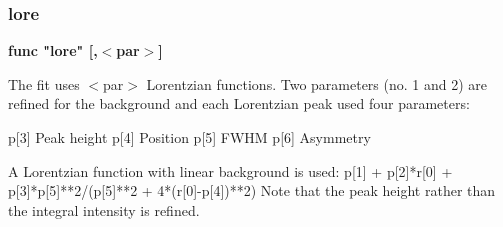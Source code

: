 \subsubsection{lore}
{\bf func "lore" [,$ <$par$> $] \par }
\par
\vspace{3pt}
The fit uses $ <$par$> $ Lorentzian functions. Two parameters (no. 1 and 2) 
are refined for the background and each Lorentzian peak used four 
parameters: 
\par
\begin{MacVerbatim}
p[3] Peak height
p[4] Position
p[5] FWHM
p[6] Asymmetry
\end{MacVerbatim}
A Lorentzian function with linear background is used: 
p[1] + p[2]*r[0] + p[3]*p[5]**2/(p[5]**2 + 4*(r[0]-p[4])**2) 
Note that the peak height rather than the integral intensity 
is refined. 
